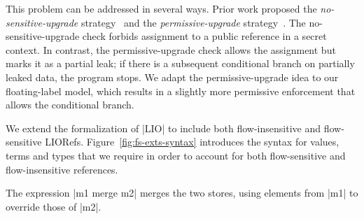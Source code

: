 This problem can be addressed in several ways. Prior work proposed the
\emph{no-sensitive-upgrade} strategy~\citep{?} and the
\emph{permissive-upgrade} strategy~\citep{?}. The no-sensitive-upgrade
check forbids assignment to a public reference in a secret context. In
contrast, the permissive-upgrade check allows the assignment but marks
it as a partial leak; if there is a subsequent conditional branch on
partially leaked data, the program stops. We adapt the
permissive-upgrade idea to our floating-label model, which results in
a slightly more permissive enforcement that allows the conditional
branch.

We extend the formalization of |LIO| to include both flow-insensitive
and flow-sensitive LIORefs. Figure~\ref{fig:fs-exts-syntax} introduces
the syntax for values, terms and types that we require in order to
account for both flow-sensitive and flow-insensitive references.

The expression |m1 merge m2| merges the two stores, using elements
from |m1| to override those of |m2|.


%
%


